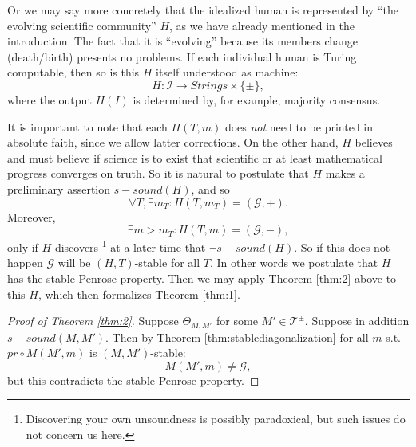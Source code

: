 \documentclass{amsart}  %
\numberwithin{equation}{section}
\newtheorem{remark}[equation]{Remark}
\theoremstyle{definition}
\theoremstyle{remark}
\begin{document}
{%
Or we may say more concretely that the idealized human is represented by ``the evolving scientific community'' $H$, as we have already mentioned in the introduction. The fact that it is ``evolving'' because its members change (death/birth) presents no problems. If each individual human is Turing computable, then so is this $H$ itself understood as machine: 
\begin{equation*}
{H}: \mathcal{I} \to Strings \times \{\pm\},
\end{equation*}
where the output $H (I)$ is determined by, for example, majority consensus.

It is important to note that each $H (T,m)$ does \emph{not} need to be printed in absolute faith,  since we allow latter corrections.
On the other hand, $H$ believes and must believe if science is to exist that scientific or at least mathematical progress converges on truth. 
So it is natural to postulate that $H$ makes a preliminary assertion $s-sound (H)$, and so $$\forall T, \exists m _{T} : H (T,m _{T} ) = (\mathcal{G},+).
$$ Moreover, 
$$\exists m > m _{T}: H (T,m ) = (\mathcal{G},-),$$
only if $H$ discovers \footnote {Discovering your own unsoundness is possibly paradoxical, but such issues do not concern us here.} at a later time that $\neg s-sound (H)$. So if this does not happen $\mathcal{G}$ will be $(H,T)$-stable for all $T$. In other words we postulate that $H$ has the stable Penrose property.  %
Then we may apply Theorem \ref{thm:2} above to this $H$, which then formalizes Theorem \ref{thm:1}.  
\begin{proof} [Proof of Theorem \ref{thm:2}] Suppose $\Theta _{ {M}, {M'}}$ for some $ {M}' \in \mathcal{T} ^{\pm}  $.
   Suppose in addition $s-sound ({M}, {M'})$.  Then  by Theorem \ref{thm:stablediagonalization} for all $m$ s.t. $pr \circ M ({M}',m)$ is $(M,M')$-stable: $$M ( {M}',m) \neq \mathcal{G},
   $$ but this contradicts the stable Penrose property.
\end{proof}
}
\end{document}
